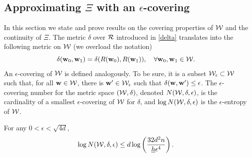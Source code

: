 \documentclass[twoside,11pt]{article}
\begin{document}
\subsection{Approximating $\Xi$ with an $\epsilon$-covering}
In this section we state and prove results on the covering properties of $\mathcal{W}$ and the continuity of $\Xi$.  
The metric $\delta$ over $\mathcal{R}$ introduced in \eqref{delta} translates into the following metric on $\mathcal{W}$ (we overload the notation)
\[
\delta(\mathbf{w}_0,\mathbf{w}_1) = \delta(R(\mathbf{w}_0), R(\mathbf{w}_1)), \quad \forall \mathbf{w}_0, \mathbf{w}_1 \in \mathcal{W}.
\] 
An $\epsilon$-covering of $\mathcal{W}$ is defined analogously.  To be sure, it is a subset $\mathcal{W}_\epsilon \subset \mathcal{W}$ such that, for all $\mathbf{w} \in \mathcal{W}$, there is $\mathbf{w}' \in \mathcal{W}_\epsilon$ such that $\delta(\mathbf{w}, \mathbf{w}') \le \epsilon$.
The $\epsilon$-covering number for the metric space $(\mathcal{W},\delta)$, denoted $N(\mathcal{W},\delta,\epsilon)$, is the cardinality of a smallest $\epsilon$-covering of $\mathcal{W}$ for $\delta$, and $\log N(\mathcal{W},\delta,\epsilon)$ is the $\epsilon$-entropy of $\mathcal{W}$.


\begin{lemma} \label{lem:entropy}
For any $0 < \epsilon < \sqrt{4d}$, 
\[
\log N(\mathcal{W}, \delta , \epsilon) \le d \log \left( \frac{32 d^2 n}{\underline h\epsilon^4} \right).
\]
\end{lemma}
\end{document}
